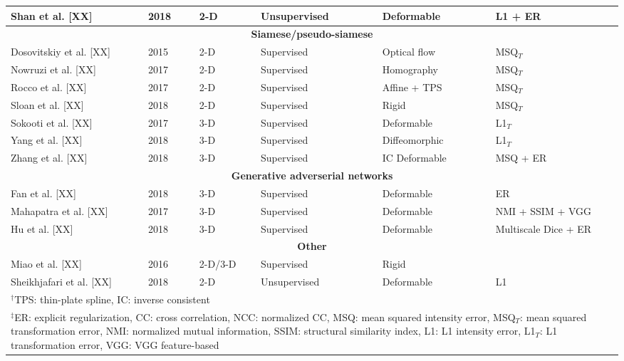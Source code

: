 \begin{table}[!htb]
\begin{tabular*}{\textwidth}{l@{\extracolsep{\fill}}l@{\extracolsep{\fill}}l@{\extracolsep{\fill}}l@{\extracolsep{\fill}}l@{\extracolsep{\fill}}l}
  Shan et al. [XX] & 2018 & 2-D & Unsupervised & Deformable & L1 + ER \\
\midrule
\multicolumn{6}{c}{\textbf{Siamese/pseudo-siamese}}
  \vspace{0.25cm} \\
  Dosovitskiy et al. [XX] & 2015 & 2-D & Supervised & Optical flow & MSQ$_T$ \\ %
  Nowruzi et al. [XX] & 2017 & 2-D & Supervised & Homography & MSQ$_T$ \\
  Rocco et al. [XX] & 2017 & 2-D & Supervised & Affine + TPS & MSQ$_T$ \\
  Sloan et al. [XX] & 2018 & 2-D & Supervised & Rigid & MSQ$_T$ \\  %
  Sokooti et al. [XX] & 2017 & 3-D & Supervised & Deformable & L1$_T$ \\
  Yang et al. [XX] & 2018 & 3-D & Supervised & Diffeomorphic & L1$_T$ \\  %
  Zhang et al. [XX] & 2018 & 3-D & Supervised & IC Deformable & MSQ + ER \\
\midrule
\multicolumn{6}{c}{\textbf{Generative adverserial networks}}
  \vspace{0.25cm} \\
  Fan et al. [XX] & 2018 & 3-D & Supervised & Deformable & ER \\
  Mahapatra et al. [XX] & 2017 & 3-D & Supervised & Deformable & NMI + SSIM + VGG \\
  Hu et al. [XX] & 2018 & 3-D & Supervised & Deformable & Multiscale Dice + ER \\
\midrule
\multicolumn{6}{c}{\textbf{Other}}
  \vspace{0.25cm} \\
  Miao et al. [XX] & 2016 & 2-D/3-D & Supervised & Rigid & {} \\
  Sheikhjafari et al. [XX] & 2018 & 2-D & Unsupervised & Deformable & L1 \\
\bottomrule
\multicolumn{6}{l}{
  \begin{minipage}[t]{0.9\columnwidth}%
    \footnotesize{$^\dagger$TPS: thin-plate spline, IC: inverse consistent}
  \end{minipage}
  } \\
\multicolumn{6}{l}{
  \begin{minipage}[t]{0.92\columnwidth}%
    \footnotesize{$^\ddagger$ER:  explicit regularization,
      CC: cross correlation, NCC: normalized CC, MSQ: mean squared intensity error,
      MSQ$_T$: mean squared transformation error,
      NMI:  normalized mutual information, SSIM:  structural similarity index,
      L1:  L1 intensity error,
      L1$_T$: L1 transformation error, VGG: VGG feature-based}
  \end{minipage}
  }
\end{tabular*}
\end{table}

